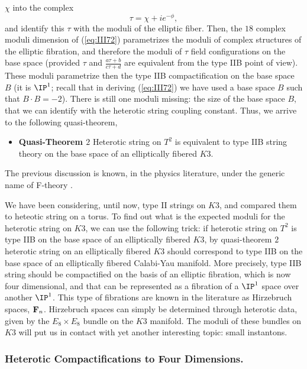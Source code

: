 $\chi$ into the complex
\begin{equation}
\tau = \chi + i e^{-\phi},
\label{eq:III74}
\end{equation}
and identify this $\tau$ with the moduli of the elliptic fiber.
Then, the $18$ complex moduli dimension of (\ref{eq:III72})
parametrizes the moduli of complex structures of the elliptic
fibration, and therefore the moduli of $\tau$ field
configurations on the base space (provided $\tau$ and $\frac
{a\tau +b}{c\tau+d}$ are equivalent from the type IIB point of
view). These moduli parametrize then the type IIB
compactification on the base space $B$ (it is $\IP^1$; recall
that in deriving (\ref{eq:III72}) we have used a base space $B$ such
that $B \cdot B=-2$). There is still one moduli missing: the size
of the base space $B$, that we can identify with the heterotic
string coupling constant. Thus, we arrive to the following
quasi-theorem,
\begin{itemize}
	\item[{}] {\bf Quasi-Theorem $2$} Heterotic string on
$T^2$ is equivalent to type IIB string theory on the base space
of an elliptically fibered $K3$.
\end{itemize}
  
The previous discussion is known, in the physics literature,
under the generic name of F-theory \cite{F,F1,F2}.
  
\vspace{2 mm}
  
We have been considering, until now, type II strings on $K3$, and
compared them to heteotic string on a torus. To find out what is
the expected moduli for the heterotic string on $K3$, we can use
the following trick: if heterotic string on $T^2$ is type IIB on
the base space of an elliptically fibered $K3$, by quasi-theorem
$2$ heterotic string on an elliptically fibered $K3$ should
correspond to type IIB on the base space of an elliptically
fibered Calabi-Yau manifold. More precisely, type IIB string
should be compactified on the basis of an elliptic fibration,
which is now four dimensional, and that can be represented as a
fibration of a $\IP^1$ space over another $\IP^1$. This type of
fibrations are known in the literature as Hirzebruch spaces,
${\bf F}_n$. Hirzebruch spaces can simply be determined through
heterotic data, given by the $E_8 \times E_8$ bundle on the $K3$
manifold. The moduli of these bundles on $K3$ will put us in
contact with yet another interesting topic: small instantons.


\subsubsection{Heterotic Compactifications to Four Dimensions.}

